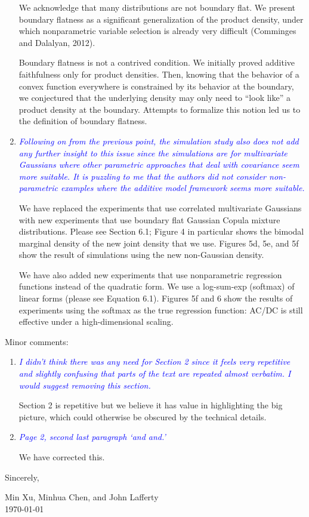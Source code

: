 \documentclass[pdftex,12pt]{article}
\def\rc#1{{\it\textcolor{blue}{#1}}\smallskip}
\begin{document}
\begin{enumerate}
We acknowledge that many distributions are not boundary flat. We
present boundary flatness as a significant generalization of the
product density, under which nonparametric variable selection is
already very difficult (Comminges and Dalalyan, 2012).

Boundary flatness is not a contrived condition. We initially proved
additive faithfulness only for product densities. Then, knowing that
the behavior of a convex function everywhere is constrained by its
behavior at the boundary, we conjectured that the underlying density may
only need to ``look like'' a product density at the boundary. Attempts
to formalize this notion led us to the definition of boundary
flatness.

\item \rc{Following on from the previous point, the simulation study also does
not add any further insight to this issue since the simulations are
for multivariate Gaussians where other parametric approaches that deal
with covariance seem more suitable. It is puzzling to me that the
authors did not consider non-parametric examples where the additive
model framework seems more suitable.}

We have replaced the experiments that use correlated multivariate
Gaussians with new experiments that use
boundary flat Gaussian Copula mixture distributions. Please see
Section 6.1; Figure 4 in particular shows the bimodal marginal density
of the new joint density that we use. Figures 5d, 5e, and 5f show the
result of simulations using the new non-Gaussian density.

We have also added new experiments that use nonparametric 
regression functions instead of the quadratic form. We use a
log-sum-exp (softmax) of linear forms (please see Equation
6.1). Figures 5f and 6 show the results of experiments using the
softmax as the true regression function: AC/DC is still effective
under a high-dimensional scaling.

\end{enumerate}

Minor comments:

\begin{enumerate}
\item \rc{I didn't think there was any need for Section 2
  since it feels very repetitive and slightly confusing that parts of
  the text are repeated almost verbatim. I would suggest removing this section.}

Section 2 is repetitive but we believe it has value in highlighting
the big picture, which could otherwise be obscured by the technical
details.

\item \rc{Page 2, second last paragraph `and and.'}

We have corrected this.

\end{enumerate}


\vspace*{10pt}

Sincerely, 


Min Xu, Minhua Chen, and John Lafferty\\[1pt]
\today{}


\end{document}
